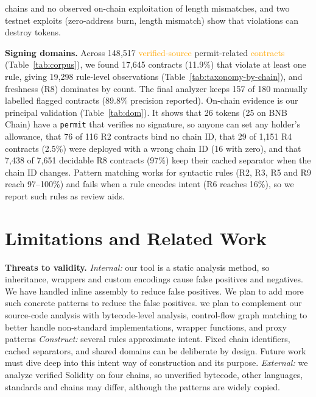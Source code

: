 \documentclass[10pt,conference]{IEEEtran}
\newcommand{\fixme}[1]{\todo[inline,color=red!20,size=\footnotesize]{#1}}
\newcommand{\AS}[1]{\textcolor{orange}{#1}}
\newcommand{\code}[1]{\texttt{#1}\xspace}
\begin{document}

chains and no observed on-chain exploitation of length mismatches, and two testnet exploits (zero-address burn, length mismatch) show that violations can
destroy tokens.
\par\textbf{Signing domains.} 
Across 148{,}517 \AS{verified-source} permit-related \AS{contracts} (Table~\ref{tab:corpus}), we found 17{,}645 contracts (11.9\%) that violate at least one rule, giving
19{,}298 rule-level observations (Table~\ref{tab:taxonomy-by-chain}), and freshness (R8) dominates by count. The final analyzer keeps 157 of 180 manually labelled flagged contracts
(89.8\% precision reported). On-chain evidence is our principal validation (Table~\ref{tab:dom}). It shows that 26 tokens (25 on BNB Chain) have a \code{permit} that verifies no signature, so
anyone can set any holder's allowance, that 76 of 116 R2 contracts bind no chain ID, that 29 of 1{,}151 R4 contracts (2.5\%) were deployed with a wrong chain ID
(16 with zero), and that 7{,}438 of 7{,}651 decidable R8 contracts (97\%) keep their cached separator when the chain ID changes. Pattern matching works for
syntactic rules (R2, R3, R5 and R9 reach 97--100\%) and fails when a rule encodes intent (R6 reaches 16\%), so we report such rules as review aids.

\FloatBarrier
\section{Limitations and Related Work}
\textbf{Threats to validity.} \emph{Internal:} our tool is a static analysis method, so inheritance, wrappers and custom encodings cause
false positives and negatives. We have handled inline assembly to reduce false positives. We plan to add more such concrete patterns to reduce the false positives. we plan to complement our source-code analysis with bytecode-level analysis,
control-flow graph matching to better handle non-standard
implementations, wrapper functions, and proxy patterns \emph{Construct:} several rules approximate intent. Fixed chain identifiers, cached separators, and shared domains can be deliberate by design. Future work must dive deep into this intent way of construction and its purpose. \emph{External:} we analyze verified Solidity on four chains, so unverified bytecode, other languages,
standards and chains may differ, although the patterns are widely copied. 
\end{document}

